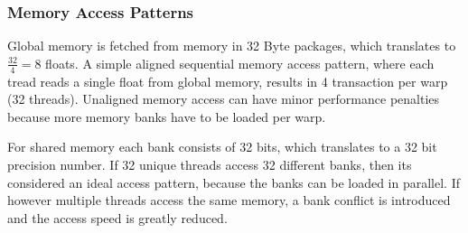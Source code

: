 \documentclass[]{article}
\begin{document}
\subsubsection{Memory Access Patterns}

Global memory is fetched from memory in 32 Byte packages, which translates to $\frac{32}{4} = 8$ floats. A simple aligned sequential memory access pattern, where each tread reads a single float from global memory, results in 4 transaction per warp (32 threads). Unaligned memory access can have minor performance penalties because more memory banks have to be loaded per warp. 

For shared memory each bank consists of 32 bits, which translates to a 32 bit precision number. If 32 unique threads access 32 different banks, then its considered an ideal access pattern, because the banks can be loaded in parallel. If however multiple threads access the same memory, a bank conflict is introduced and the access speed is greatly reduced.


\begin{figure}[H]
	\begin{center}
	\end{center}
\end{figure}
\end{document}
